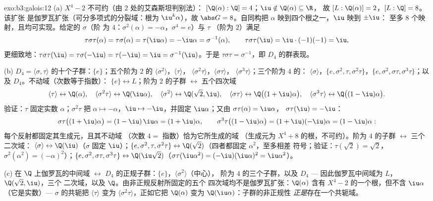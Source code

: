 \begin{solution}{exo:b3:galois:12}
(a) $X^4 - 2$ 不可约（由 $2$ 处的艾森斯坦判别法）：
$[\Q(\alpha):\Q] = 4$；$\iu \notin \Q(\alpha) \subseteq \R$，
故 $[L : \Q(\alpha)] = 2$，$[L:\Q] = 8$。该扩张
是伽罗瓦扩张（可分多项式的分裂域：根为
$\iu^k\alpha$），故 $\abs G = 8$。自同构把
$\alpha$ 映到四个根之一，$\iu$ 映到 $\pm\iu$：
至多 $8$ 个映射，且均可实现。给定的 $\sigma$（阶
为 $4$：$\sigma^2(\alpha) = -\alpha$，$\sigma^4 = e$）与 $\tau$
（阶为 $2$）满足
\[
\tau\sigma\tau(\alpha) = \tau\sigma(\alpha) =
\tau(\iu\alpha) = -\iu\alpha = \sigma^{-1}(\alpha),
\qquad \tau\sigma\tau(\iu) = \iu\cdot(-1)(-1) = \iu ,
\]
更细致地：$\tau\sigma\tau(\iu) = \tau\sigma(-\iu) =
\tau(-\iu) = \iu = \sigma^{-1}(\iu)$。于是 $\tau\sigma\tau =
\sigma^{-1}$，即 $D_4$ 的群表现。

(b) $D_4 = \langle\sigma,
\tau\rangle$ 的十个子群：$\{e\}$；五个阶为 $2$ 的
$\langle\sigma^2\rangle$，$\langle\tau\rangle$，
$\langle\sigma^2\tau\rangle$，$\langle\sigma\tau\rangle$，
$\langle\sigma^3\tau\rangle$；三个阶为 $4$ 的：
$\langle\sigma\rangle$，$\{e, \sigma^2, \tau,
\sigma^2\tau\}$，$\{e, \sigma^2, \sigma\tau,
\sigma^3\tau\}$；以及 $D_4$。不动域（次数等于指数）：
$\{e\} \leftrightarrow L$；阶为 $2$ 的子群
$\leftrightarrow$ 五个四次域
\[
\langle\tau\rangle \leftrightarrow \Q(\alpha),\quad
\langle\sigma^2\tau\rangle \leftrightarrow \Q(\iu\alpha),
\quad
\langle\sigma^2\rangle \leftrightarrow \Q(\sqrt2, \iu),\quad
\langle\sigma\tau\rangle \leftrightarrow
\Q\bigl((1+\iu)\alpha\bigr),\quad
\langle\sigma^3\tau\rangle \leftrightarrow
\Q\bigl((1-\iu)\alpha\bigr) .
\]
验证：$\tau$ 固定实数 $\alpha$；$\sigma^2\tau$ 把
$\alpha \mapsto -\alpha$，$\iu \mapsto -\iu$，并固定
$\iu\alpha$；又由 $\sigma\tau(\alpha) = \iu\alpha$，
$\sigma\tau(\iu) = -\iu$：
\[
\sigma\tau\bigl((1+\iu)\alpha\bigr) =
(1 - \iu)\,\iu\alpha = (1 + \iu)\alpha,
\qquad
\sigma^3\tau\bigl((1-\iu)\alpha\bigr) =
(1 + \iu)(-\iu)\alpha = (1 - \iu)\alpha :
\]
每个反射都固定其生成元，且其不动域
（次数 $4 = $ 指数）恰为它所生成的域
（生成元为 $X^4 + 8$ 的根，不可约）。阶为 $4$ 的子群
$\leftrightarrow$ 三个二次域：
$\langle\sigma\rangle \leftrightarrow \Q(\iu)$（$\sigma$
固定 $\iu$）；$\{e, \sigma^2, \tau, \sigma^2\tau\}
\leftrightarrow \Q(\sqrt2)$（四者都固定 $\alpha^2$，至多相差
符号；验证：$\tau(\sqrt2) = \sqrt2$，$\sigma^2(\alpha^2) =
(-\alpha)^2$）；$\{e, \sigma^2, \sigma\tau, \sigma^3\tau\}
\leftrightarrow \Q(\iu\sqrt2)$（$\sigma\tau(\iu\alpha^2) =
(-\iu)(\iu\alpha)^2 = \iu\alpha^2$）。

(c) 在 $\Q$ 上伽罗瓦的中间域 $\leftrightarrow$
$D_4$ 的正规子群：$\{e\}$，$\langle\sigma^2\rangle$（中心），
阶为 $4$ 的三个子群，以及 $D_4$ --- 因此伽罗瓦中间域为
$L$，$\Q(\sqrt2, \iu)$，三个
二次域，以及 $\Q$。由非正规反射所固定的五个
四次域均不是伽罗瓦扩张：$\Q(\alpha)$ 含有
$X^4 - 2$ 的一个根，但不含 $\iu\alpha$（它是实数）---
$\sigma$ 的共轭把 $\langle\tau\rangle$ 变为
$\langle\sigma^2\tau\rangle$，正如它把
$\Q(\alpha)$ 变为 $\Q(\iu\alpha)$：子群的非正规性
\emph{正是}存在一个共轭域。
\end{solution}

